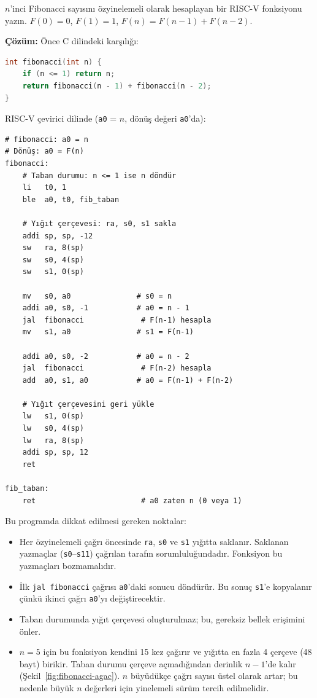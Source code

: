\begin{ornek}[4.14]
\label{orn:fibonacci}
$n$'inci Fibonacci sayısını özyinelemeli olarak hesaplayan bir RISC-V fonksiyonu yazın. $F(0) = 0$, $F(1) = 1$, $F(n) = F(n-1) + F(n-2)$.

\textbf{Çözüm:} Önce C dilindeki karşılığı:

\begin{lstlisting}[language=C, style=alistirma-kod]
int fibonacci(int n) {
    if (n <= 1) return n;
    return fibonacci(n - 1) + fibonacci(n - 2);
}
\end{lstlisting}

RISC-V çevirici dilinde (\texttt{a0} = $n$, dönüş değeri \texttt{a0}'da):

\begin{lstlisting}[style=riscv]
# fibonacci: a0 = n
# Dönüş: a0 = F(n)
fibonacci:
    # Taban durumu: n <= 1 ise n döndür
    li   t0, 1
    ble  a0, t0, fib_taban

    # Yığıt çerçevesi: ra, s0, s1 sakla
    addi sp, sp, -12
    sw   ra, 8(sp)
    sw   s0, 4(sp)
    sw   s1, 0(sp)

    mv   s0, a0               # s0 = n
    addi a0, s0, -1           # a0 = n - 1
    jal  fibonacci             # F(n-1) hesapla
    mv   s1, a0               # s1 = F(n-1)

    addi a0, s0, -2           # a0 = n - 2
    jal  fibonacci             # F(n-2) hesapla
    add  a0, s1, a0           # a0 = F(n-1) + F(n-2)

    # Yığıt çerçevesini geri yükle
    lw   s1, 0(sp)
    lw   s0, 4(sp)
    lw   ra, 8(sp)
    addi sp, sp, 12
    ret

fib_taban:
    ret                        # a0 zaten n (0 veya 1)
\end{lstlisting}

Bu programda dikkat edilmesi gereken noktalar:
\begin{itemize}
\item Her özyinelemeli çağrı öncesinde \texttt{ra}, \texttt{s0} ve \texttt{s1} yığıtta saklanır. Saklanan yazmaçlar (\texttt{s0}--\texttt{s11}) çağrılan tarafın sorumluluğundadır. Fonksiyon bu yazmaçları bozmamalıdır.
\item İlk \texttt{jal fibonacci} çağrısı \texttt{a0}'daki sonucu döndürür. Bu sonuç \texttt{s1}'e kopyalanır çünkü ikinci çağrı \texttt{a0}'yı değiştirecektir.
\item Taban durumunda yığıt çerçevesi oluşturulmaz; bu, gereksiz bellek erişimini önler.
\item $n = 5$ için bu fonksiyon kendini 15 kez çağırır ve yığıtta en fazla 4 çerçeve (48 bayt) birikir. Taban durumu çerçeve açmadığından derinlik $n-1$'de kalır (Şekil~\ref{fig:fibonacci-agac}). $n$ büyüdükçe çağrı sayısı üstel olarak artar; bu nedenle büyük $n$ değerleri için yinelemeli sürüm tercih edilmelidir.
\end{itemize}


\end{ornek}
